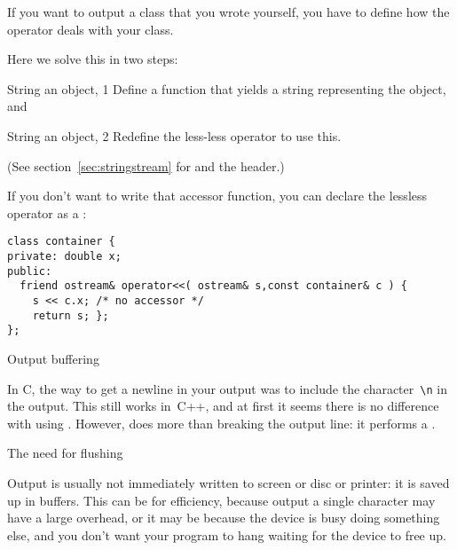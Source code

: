   If you want to output a class that you wrote yourself, you have to
  define how the \n{<<} operator deals with your class.

Here we solve this in two steps:

\begin{block}{String an object, 1}
  \label{sl:class-cout1}
 Define a function that yields a string representing the object, and 

  \lstset{style=snippetcode}
\end{block}

\begin{block}{String an object, 2}
  \label{sl:class-cout2}
  Redefine the less-less operator to use this.

  \lstset{style=snippetcode}
\end{block}

(See section~\ref{sec:stringstream} for  and the
 header.)


If you don't want to write that accessor function, you can declare
the lessless operator as a :
\begin{lstlisting}
class container {
private: double x;
public:
  friend ostream& operator<<( ostream& s,const container& c ) {
    s << c.x; /* no accessor */
    return s; };
};
\end{lstlisting}

 {Output buffering}
\label{sec:to-endl-or-not}

In C, the way to get a newline in your output was to include the
character~\verb+\n+ in the output. This still works in~C++, and at
first it seems there is no difference with using . However,
 does more than breaking the output line: it
performs a .

 {The need for flushing}

Output is usually not immediately written to screen or disc or
printer: it is saved up in buffers. This can be for efficiency,
because output a single character may have a large overhead, or it may
be because the device is busy doing something else, and you don't want
your program to hang waiting for the device to free up.

